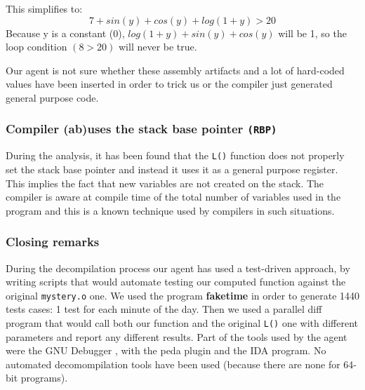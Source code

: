 This simplifies to:
$$7 + sin(y) + cos(y) + log(1+y) > 20$$
Because y is a constant (0), $log(1+y) + sin(y) + cos(y)$ will be 1, so the loop condition $(8 > 20)$ will never be true.

Our agent is not sure whether these assembly artifacts and a lot of hard-coded values have been inserted in order to trick us or the compiler just generated general purpose code.

\subsubsection{Compiler (ab)uses the stack base pointer \texttt{(RBP)}}
During the analysis, it has been found that the \texttt{L()} function does not properly set the stack base pointer and instead it uses it as a general purpose register. This implies the fact that new variables are not created on the stack. The compiler is aware at compile time of the total number of variables used in the program and this is a known technique used by compilers in such situations.

\subsubsection{Closing remarks}
During the decompilation process our agent has used a test-driven approach, by writing scripts that would automate testing our computed function against the original \texttt{mystery.o} one. We used the program \textbf{faketime} in order to generate 1440 tests cases: 1 test for each minute of the day. Then we used a parallel diff program that would call both our function and the original \texttt{L()} one with different parameters and report any different results. Part of the tools used by the agent were the GNU Debugger , with the peda plugin and the IDA program. No automated decomompilation tools have been used (because there are none for 64-bit programs).
